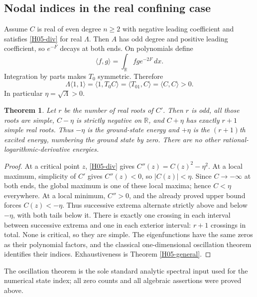 \documentclass[11pt,a4paper]{article}
\newtheorem{theorem}{Theorem}[section]
\theoremstyle{definition}\newtheorem{definition}[theorem]{Definition}
\theoremstyle{remark}\newtheorem{remark}[theorem]{Remark}
\newcommand{\R}{\mathbb R}\newcommand{\C}{\mathbb C}\newcommand{\N}{\mathbb N}
\numberwithin{equation}{section}
\begin{document}
\subsection{Nodal indices in the real confining case}\label{H05-sec-2}
Assume $C$ is real of even degree $n\ge2$ with negative leading coefficient and satisfies \eqref{H05-div} for real $\Lambda$. Then $A$ has odd degree and positive leading coefficient, so $e^{-F}$ decays at both ends. On polynomials define
\[\langle f,g\rangle=\int_\R fg e^{-2F}\,dx.\]
Integration by parts makes $T_0$ symmetric. Therefore
\[\Lambda\langle1,1\rangle=\langle1,T_0C\rangle
=\langle T_01,C\rangle=\langle C,C\rangle>0.
\]
In particular $\eta=\sqrt\Lambda>0$.
\begin{theorem}\label{H05-nodes}
Let $r$ be the number of real roots of $C'$. Then $r$ is odd, all those roots are simple, $C-\eta$ is strictly negative on $\R$, and $C+\eta$ has exactly $r+1$ simple real roots. Thus $-\eta$ is the ground-state energy and $+\eta$ is the $(r+1)$th excited energy, numbering the ground state by zero. There are no other rational-logarithmic-derivative energies.
\end{theorem}
\begin{proof}
At a critical point $z$, \eqref{H05-div} gives $C''(z)=C(z)^2-\eta^2$. At a local maximum, simplicity of $C'$ gives $C''(z)<0$, so $|C(z)|<\eta$. Since $C\to-\infty$ at both ends, the global maximum is one of these local maxima; hence $C<\eta$ everywhere. At a local minimum, $C''>0$, and the already proved upper bound forces $C(z)<-\eta$. Thus successive extrema alternate strictly above and below $-\eta$, with both tails below it. There is exactly one crossing in each interval between successive extrema and one in each exterior interval: $r+1$ crossings in total. None is critical, so they are simple. The eigenfunctions have the same zeros as their polynomial factors, and the classical one-dimensional oscillation theorem identifies their indices. Exhaustiveness is Theorem \ref{H05-general}.
\end{proof}
The oscillation theorem is the sole standard analytic spectral input used for the numerical state index; all zero counts and all algebraic assertions were proved above.
\end{document}

